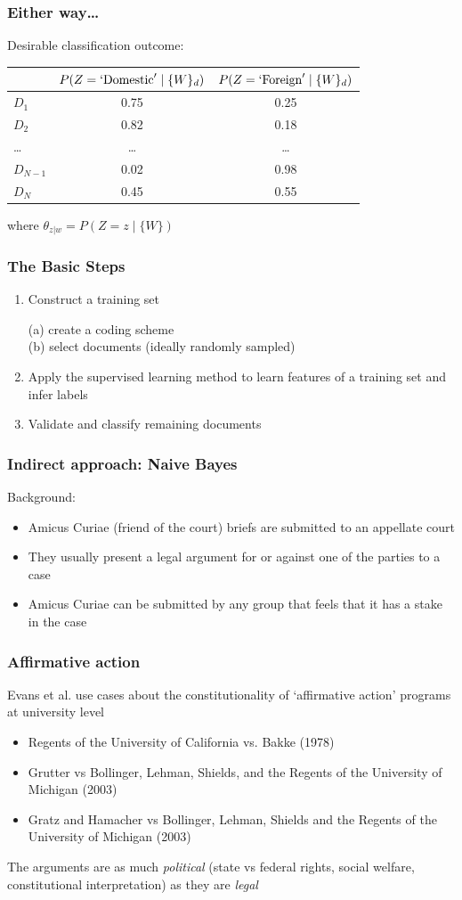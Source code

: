 \documentclass[11pt,compress,professionalfonts]{beamer}
\newcommand{\ita}{\begin{itemize}}
\newcommand{\itm}{\item[]}
\newcommand{\itz}{\end{itemize}}
\begin{document}
\begin{frame}[t,fragile]\frametitle{Either way\ldots}

Desirable classification outcome:

\begin{center}
\begin{tabular}{lcc}
& $P(Z=`\text{Domestic}'\mid \{W\}_d)$ & $P(Z=`\text{Foreign}' \mid \text \{W\}_d)$ \\ \toprule
$D_1$ & 0.75 & 0.25 \\
$D_2$ & 0.82 & 0.18 \\
\ldots & \ldots & \ldots\\
$D_{N-1}$ & 0.02 & 0.98 \\
$D_N$ & 0.45 & 0.55\\ \bottomrule
\end{tabular}
\end{center}

where $\theta_{z|w} = P(Z=z \mid \{W\})$

\end{frame}
\begin{frame}[t,fragile]\frametitle{The Basic Steps}

\begin{enumerate}

\item Construct a training set

(a) create a coding scheme\\
(b) select documents (ideally randomly sampled)

\item Apply the supervised learning method to learn features of a training set and infer labels

\item Validate and classify remaining documents

\end{enumerate}

\end{frame}
\begin{frame}[t,fragile]\frametitle{Indirect approach: Naive Bayes}

Background:
\ita
\itm Amicus Curiae (friend of the court) briefs are submitted to an appellate court
\itm They usually present a legal argument for or against one of the parties to a case
\itm Amicus Curiae can be submitted by any group that feels that it has a stake in the case
\itz

\end{frame}
\begin{frame}[t,fragile]\frametitle{Affirmative action}

Evans et al. use cases about the constitutionality of `affirmative action' programs at university level
\ita
\itm Regents of the University of California vs. Bakke (1978)
\itm Grutter vs Bollinger, Lehman, Shields, and the Regents of the University of Michigan (2003)
\itm Gratz and Hamacher vs Bollinger, Lehman, Shields and the Regents of the University of Michigan (2003)
\itz
The arguments are as much \textsl{political} (state vs federal rights, social welfare, constitutional interpretation) as they are \textsl{legal}

\end{frame}
\end{document}
